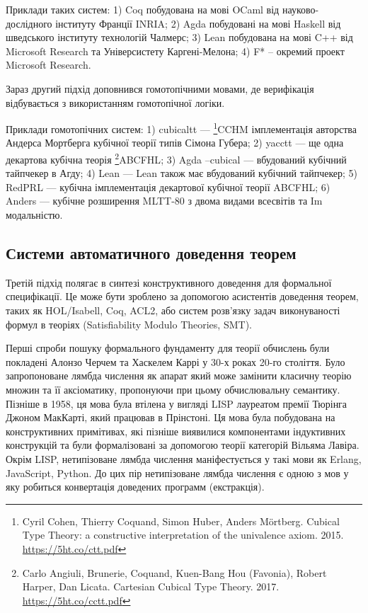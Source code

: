 Приклади таких систем:
1) Coq побудована на мові OCaml від науково-дослідного інституту Франції INRIA;
2) Agda побудовані на мові Haskell від шведського інституту технологій Чалмерс;
3) Lean побудована на мові C++ від Microsoft Research та Універсистету Каргені-Мелона;
4) F* -- окремий проект Microsoft Research.

Зараз другий підхід доповнився гомотопічними мовами, де верифікація відбувається
з використанням гомотопічної логіки.

Приклади гомотопічних систем:
1) cubicaltt --- \footnote{Cyril Cohen, Thierry Coquand, Simon Huber, Anders M{\"{o}}rtberg. Cubical Type Theory: a constructive interpretation of the univalence axiom. 2015. \url{https://5ht.co/ctt.pdf}}{CCHM} імплементація авторства Андерса Мортберга кубічної теорії типів Сімона Губера;
2) yacctt --- ще одна декартова кубічна теорія \footnote{Carlo Angiuli, Brunerie, Coquand, Kuen-Bang Hou (Favonia), Robert Harper, Dan Licata. Cartesian Cubical Type Theory. 2017. \url{https://5ht.co/cctt.pdf}}{ABCFHL};
3) Agda --cubical --- вбудований кубічний тайпчекер в Агду;
4) Lean --- Lean також має вбудований кубічний тайпчекер;
5) RedPRL --- кубічна імплементація декартової кубічної теорії ABCFHL;
6) Anders --- кубічне розширення MLTT-80 з двома видами всесвітів та Im модальністю.

\subsection{Системи автоматичного доведення теорем}
Третій підхід полягає в синтезі конструктивного доведення
для формальної специфікації. Це може бути зроблено за
допомогою асистентів доведення теорем, таких як HOL/Isabell, Coq, ACL2,
або систем розв'язку задач виконуваності формул в теоріях (Satisfiability
Modulo Theories, SMT).

Перші спроби пошуку формального фундаменту для теорії обчислень були покладені
Алонзо Черчем та Хаскелем Каррі у 30-х роках 20-го століття. Було запропоноване
лямбда числення як апарат який може замінити класичну теорію множин та її аксіоматику,
пропонуючи при цьому обчислювальну семантику. Пізніше в 1958, ця мова була втілена
у вигляді LISP лауреатом премії Тюрінга Джоном МакКарті, який працював в Прінстоні.
Ця мова була побудована на конструктивних примітивах, які пізніше виявилися компонентами
індуктивних конструкцій та були формалізовані за допомогою
теорії категорій Вільяма Лавіра. Окрім LISP, нетипізоване лямбда числення
маніфестується у такі мови як Erlang, JavaScript, Python.
До цих пір нетипізоване лямбда числення є одною з мов у яку робиться
конвертація доведених программ (екстракція).

